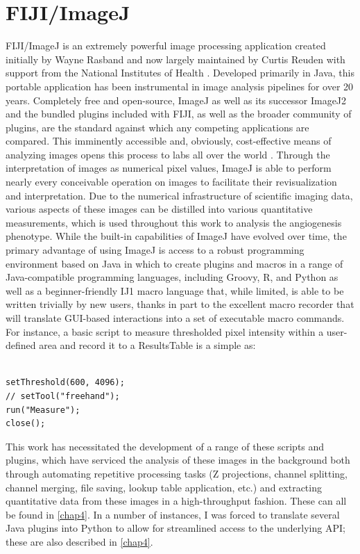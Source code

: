 \section{FIJI/ImageJ}\label{imagej}

FIJI/ImageJ is an extremely powerful image processing application created initially by Wayne Rasband and now largely maintained by Curtis Reuden with support from the National Institutes of Health \citep{Schneider2012}. Developed primarily in Java, this portable application has been instrumental in image analysis pipelines for over 20 years. Completely free and open-source, ImageJ as well as its successor ImageJ2 and the bundled plugins included with FIJI, as well as the broader community of plugins, are the standard against which any competing applications are compared. This imminently accessible and, obviously, cost-effective means of analyzing images opens this process to labs all over the world \citep{Girish2004}. Through the interpretation of images as numerical pixel values, ImageJ is able to perform nearly every conceivable operation on images to facilitate their revisualization and interpretation. Due to the numerical infrastructure of scientific imaging data, various aspects of these images can be distilled into various quantitative measurements, which is used throughout this work to analysis the angiogenesis phenotype. While the built-in capabilities of ImageJ have evolved over time, the primary advantage of using ImageJ is access to a robust programming environment based on Java in which to create plugins and macros in a range of Java-compatible programming languages, including Groovy, R, and Python as well as a beginner-friendly IJ1 macro language that, while limited, is able to be written trivially by new users, thanks in part to the excellent macro recorder that will translate GUI-based interactions into a set of executable macro commands. For instance, a basic script to measure thresholded pixel intensity within a user-defined area and record it to a ResultsTable is a simple as:
 
\begin{lstlisting}

setThreshold(600, 4096);
// setTool("freehand");
run("Measure");
close();

\end{lstlisting}

This work has necessitated the development of a range of these scripts and plugins, which have serviced the analysis of these images in the background both through automating repetitive processing tasks (Z projections, channel splitting, channel merging, file saving, lookup table application, etc.) and extracting quantitative data from these images in a high-throughput fashion. These can all be found in \autoref{chap4}. In a number of instances, I was forced to translate several Java plugins into Python to allow for streamlined access to the underlying API; these are also described in \autoref{chap4}.

